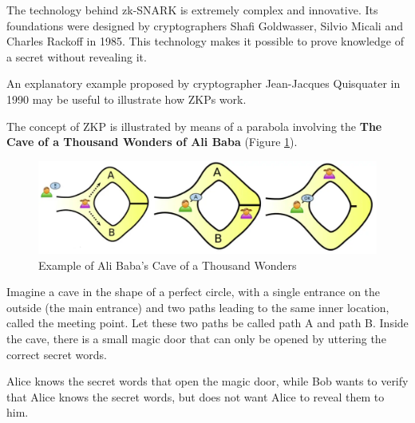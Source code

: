 The technology behind zk-SNARK is extremely complex and innovative. Its foundations were designed by cryptographers Shafi Goldwasser, Silvio Micali and Charles Rackoff in 1985. This technology makes it possible to prove knowledge of a secret without revealing it.

\noindent An explanatory example proposed by cryptographer Jean-Jacques Quisquater in 1990 may be useful to illustrate how ZKPs work.

\noindent The concept of ZKP is illustrated by means of a parabola involving the \textbf{The Cave of a Thousand Wonders of Ali Baba} (Figure \ref{fig:alibaba}).

\begin{figure}[!ht]
    \centering
    \includegraphics[width=1\linewidth]{img/alibaba.png}
    \caption{Example of Ali Baba's Cave of a Thousand Wonders}
    \label{fig:alibaba}
\end{figure}

\noindent Imagine a cave in the shape of a perfect circle, with a single entrance on the outside (the main entrance) and two paths leading to the same inner location, called the meeting point. Let these two paths be called path A and path B. Inside the cave, there is a small magic door that can only be opened by uttering the correct secret words.

\noindent Alice knows the secret words that open the magic door, while Bob wants to verify that Alice knows the secret words, but does not want Alice to reveal them to him.


